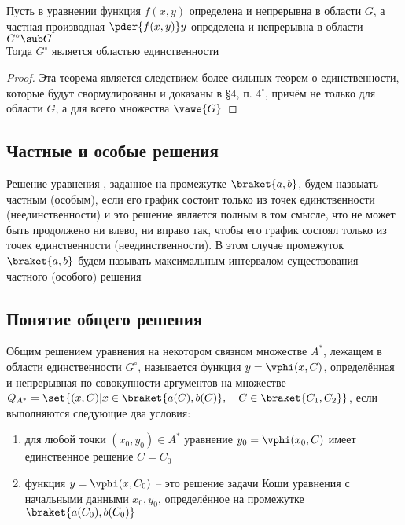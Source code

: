 \begin{theorem}\label{th:uniq:weak}
    Пусть в уравнении  функция $ f(x, y) $ определена и непрерывна в области $ G $, а частная производная $ \pder{f(x, y)}y $ определена и непрерывна в области $ G^\circ \sub G $ \\
    Тогда $ G^\circ $ является областью единственности
\end{theorem}

\begin{proof}
    Эта теорема является следствием более сильных теорем о единственности, которые будут свормулированы и доказаны в \S4, п. $ 4^\circ $, причём не только для области $ G $, а для всего множества $ \vawe{G} $
\end{proof}

\subsection{Частные и особые решения}

\begin{definition}
    Решение уравнения , заданное на промежутке $ \braket{a, b} $, будем назвыать частным (особым), если его график состоит только из точек единственности (неединственности) и это решение является полным в том смысле, что не может быть продолжено ни влево, ни вправо так, чтобы его график состоял только из точек единственности (неединственности). В этом случае промежуток $ \braket{a, b} $ будем называть максимальным интервалом существования частного (особого) решения
\end{definition}

\subsection{Понятие общего решения}

\begin{definition}\label{def:common}
    Общим решением уравнения  на некотором связном множестве $ A^* $, лежащем в области единственности $ G^\circ $, называется функция $ y = \vphi(x, C) $, определённая и непрерывная по совокупности аргументов на множестве $ Q_{A^*} = \set{(x, C) | x \in \braket{a(C), b(C)}, \quad C \in \braket{C_1, C_2}} $, если выполняются следующие два условия:
    \begin{enumerate}
    	\item для любой точки $ (x_0, y_0) \in A^* $ уравнение $ y_0 = \vphi(x_0, C) $ имеет единственное решение $ C = C_0 $
        \item функция $ y = \vphi(x, C_0) $ -- это решение задачи Коши уравнения  с начальными данными $ x_0, y_0 $, определённое на промежутке $ \braket{a(C_0), b(C_0)} $
    \end{enumerate}
\end{definition}

